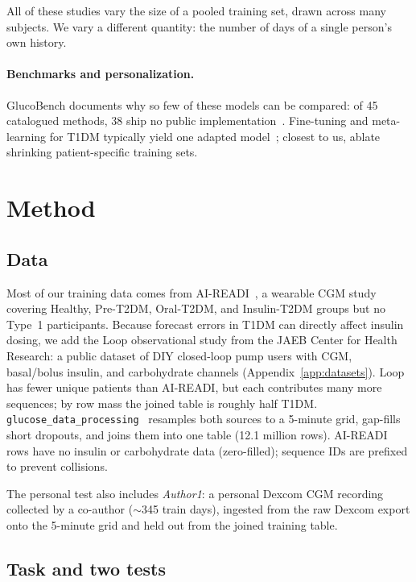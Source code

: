 \documentclass[11pt,a4paper]{article}
\begin{document}
All of these studies vary the size of a pooled training set, drawn across
many subjects. We vary a different quantity: the number of days of a single
person's own history.

\paragraph{Benchmarks and personalization.}
GlucoBench documents why so few of these models can be compared: of 45
catalogued methods, 38 ship no public
implementation~\citep{sergazinov2024glucobench}. Fine-tuning and
meta-learning for T1DM typically yield one adapted
model~\citep{zhu2023personalized}; closest to us,
\citet{rigamonti2026patientspecific} ablate shrinking patient-specific
training sets.

\section{Method}
\label{sec:method}

\subsection{Data}
\label{sec:data}

Most of our training data comes from AI-READI~\citep{aireadi2024}, a
wearable CGM study covering Healthy, Pre-T2DM, Oral-T2DM, and Insulin-T2DM
groups but no Type~1 participants. Because forecast errors in T1DM can
directly affect insulin dosing, we add the Loop observational study from the
JAEB Center for Health Research: a public dataset of DIY closed-loop pump
users with CGM, basal/bolus insulin, and carbohydrate channels
(Appendix~\ref{app:datasets}). Loop has fewer unique patients than
AI-READI, but each contributes many more sequences; by row mass the joined
table is roughly half T1DM.
\texttt{glucose\_data\_processing}~\citep{glucosedataprocessing} resamples
both sources to a 5-minute grid, gap-fills short dropouts, and joins them
into one table (12.1 million rows). AI-READI rows have no insulin or
carbohydrate data (zero-filled); sequence IDs are prefixed to prevent
collisions.

The personal test also includes \emph{Author1}: a personal Dexcom CGM
recording collected by a co-author (\(\sim\)345 train days), ingested from
the raw Dexcom export onto the 5-minute grid and held out from the joined
training table.

\subsection{Task and two tests}
\label{sec:task}
\end{document}
